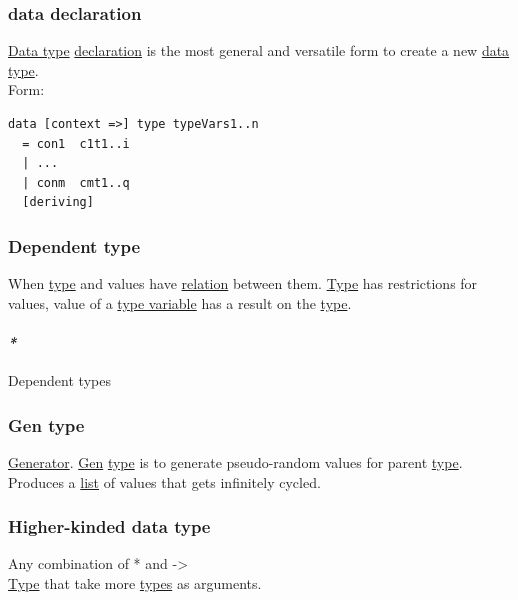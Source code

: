 \documentclass[11pt]{article}
\begin{document}
\subsubsection{\label{org9b3601c}data declaration}
\label{sec:orgb600261}
\hyperref[org965cde3]{Data type} \hyperref[org56ef1b9]{declaration} is the most general and versatile form to create a new \hyperref[org965cde3]{data type}.\\
Form:\\
\begin{verbatim}
data [context =>] type typeVars1..n
  = con1  c1t1..i
  | ...
  | conm  cmt1..q
  [deriving]
\end{verbatim}

\subsubsection{\label{org2d7956f}Dependent type}
\label{sec:org782f994}
When \hyperref[org4fbaeb8]{type} and values have \hyperref[org6e8ae46]{relation} between them. \hyperref[org4fbaeb8]{Type} has restrictions for values, value of a \hyperref[orgd6d755f]{type variable} has a result on the \hyperref[org4fbaeb8]{type}.\\

\paragraph{\emph{*}}
\label{sec:org4c4f7bb}

\label{orgae20a26}Dependent types\\

\subsubsection{\label{org2582400}Gen type}
\label{sec:org76ef004}
\hyperref[org7808460]{Generator}. \hyperref[org7cb9854]{Gen} \hyperref[org4fbaeb8]{type} is to generate pseudo-random values for parent \hyperref[org4fbaeb8]{type}. Produces a \hyperref[org8ae0f28]{list} of values that gets infinitely cycled.\\

\subsubsection{\label{orgc6f7147}Higher-kinded data type}
\label{sec:orgd5cdd8b}
Any combination of * and ->\\

\hyperref[org4fbaeb8]{Type} that take more \hyperref[org3927fd9]{types} as arguments.\\
\end{document}
